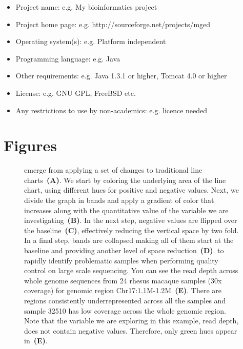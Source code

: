 \documentclass{bmcart}
\begin{document}
\begin{itemize}
  \item Project name: e.g. My bioinformatics project
  \item Project home page: e.g. http://sourceforge.net/projects/mged
  \item Operating system(s): e.g. Platform independent
  \item Programming language: e.g. Java
  \item Other requirements: e.g. Java 1.3.1 or higher, Tomcat 4.0 or higher
  \item License: e.g. GNU GPL, FreeBSD etc.
  \item Any restrictions to use by non-academics: e.g. licence needed
\end{itemize}






\section*{Figures}
\begin{figure}[h!]

\caption{
   emerge from applying a set of changes to traditional line
  charts~\textbf{(A)}. We start by coloring the underlying area of the line chart,
  using different hues for positive and negative values. Next, we divide the
  graph in bands and apply a gradient of color that increases along with the
  quantitative value of the variable we are investigating~\textbf{(B)}. In the
  next step, negative values are flipped over the baseline~\textbf{(C)},
  effectively reducing the vertical space by two fold. In a final step, bands are
  collapsed making all of them start at the baseline and providing another level
  of space reduction~\textbf{(D)}.  
   to rapidly identify problematic samples
  when performing quality control on large scale sequencing.
  You can see the read depth across whole genome sequences from 24 rhesus macaque
  samples (30x coverage) for genomic region Chr17:1.1M-1.2M~\textbf{(E)}.
  There are regions consistently underrepresented across all the
  samples and sample 32510 has low coverage across the whole genomic region.
  Note that the variable we are exploring in this example, read depth, does not
  contain negative values. Therefore, only green hues appear in~\textbf{(E)}.
}\label{fig:01}

\end{figure}
\end{document}
